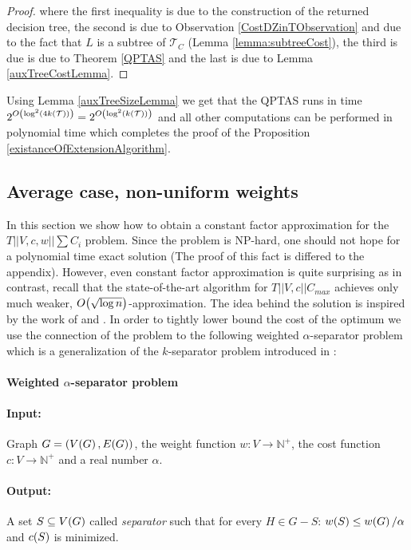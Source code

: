 \begin{lemma}
\begin{proof}
        where the first inequality is due to the construction of the returned decision tree, the second is due to Observation \ref{CostDZinTObservation} and due to the fact that $L$ is a subtree of $\mathcal{T}_C$ (Lemma \ref{lemma:subtreeCost}), the third is due is due to Theorem \ref{QPTAS} and the last is due to Lemma \ref{auxTreeCostLemma}.
        
    \end{proof}
\end{lemma}

Using Lemma \ref{auxTreeSizeLemma} we get that the QPTAS runs in time $2^{O\mathopen{}\left( \log^2\mathopen{}\left( 4k\mathopen{}\left( \mathcal{T} \right) \right) \right)}=2^{O\mathopen{}\left( \log^2\mathopen{}\left( k\mathopen{}\left( \mathcal{T} \right) \right) \right)}$ and all other computations can be performed in polynomial time which completes the proof of the Proposition \ref{existanceOfExtensionAlgorithm}.

\subsection{Average case, non-uniform weights}
In this section we show how to obtain a constant factor approximation for the $T||V,c,w||\sum C_i$ problem. Since the problem is NP-hard, one should not hope for a polynomial time exact solution (The proof of this fact is differed to the appendix). However, even constant factor approximation is quite surprising as in contrast, recall that the state-of-the-art algorithm for $T||V,c||C_{max}$ achieves only much weaker, $O\mathopen{}\left( \sqrt{\log n} \right)$-approximation. The idea behind the solution is inspired by the work of \cite{Approximatehierarchicalclusteringviasparsestcutandspreadingmetrics} and \cite{kseparator}. In order to tightly lower bound the cost of the optimum we use the connection of the problem to the following weighted $\alpha$-separator problem which is a generalization of the $k$-separator problem introduced in \cite{kseparator}:
\paragraph{Weighted $\alpha$-separator problem}
\begin{tcolorbox}[colback=white, title=Weighted $\alpha$-separator problem, fonttitle=\bfseries, breakable]
\paragraph{Input:} Graph $G=\mathopen{}\left( V\mathopen{}\left( G \right), E\mathopen{}\left( G \right) \right)$, the weight function $w:V\to \mathbb{N}^+$, the cost function $c:V\to \mathbb{N}^+$ and a real number $\alpha$.
\paragraph{Output:} A set $S\subseteq V\mathopen{}\left( G \right)$ called \textit{separator} such that for every $H\in G-S$: $w\mathopen{}\left( S \right)\leq w\mathopen{}\left( G \right)/\alpha$ and $c\mathopen{}\left( S \right)$ is minimized.
\end{tcolorbox}

